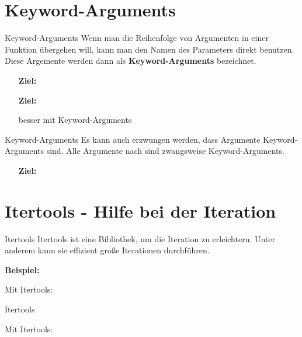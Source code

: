 \section{Keyword-Arguments}
\begin{frame}{Keyword-Arguments}
	Wenn man die Reihenfolge von Argumenten in einer Funktion übergehen will, kann man den Namen des Parameters direkt benutzen. Diese Argemente werden dann als \textbf{Keyword-Arguments} bezeichnet.
	
	\pause
	\begin{itemize}
		\item[\textbf{Ziel:}] 
		
		\pause
		\item[\textbf{Ziel:}] 
		
		besser mit Keyword-Arguments
		
	\end{itemize}
\end{frame}

\begin{frame}{Keyword-Arguments}
	Es kann auch erzwungen werden, dass Argumente Keyword-Arguments sind. Alle Argumente nach \codeline{, *, } sind zwangsweise Keyword-Arguments.
	\linebreak
	
	\begin{itemize}
		\item[\textbf{Ziel:}] 
		
	\end{itemize}
\end{frame}

\section{Itertools - Hilfe bei der Iteration}
\begin{frame}{Itertools}
	Itertools ist eine Bibliothek, um die Iteration zu erleichtern. Unter anderem kann sie effizient große Iterationen durchführen.
	
	
	\pause
	\textbf{Beispiel:}
	
	
	\pause
	Mit Itertools:
	
\end{frame}

\begin{frame}{Itertools}
	
	
	Mit Itertools:
	
\end{frame}


